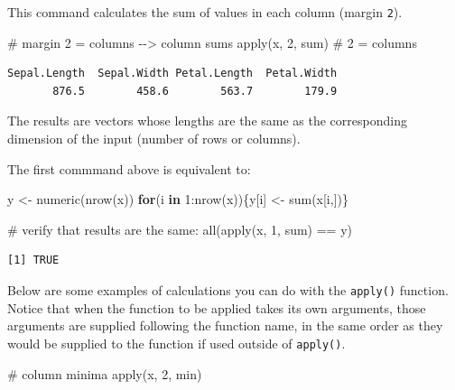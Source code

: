 \documentclass[
  13,
  letterpaper,
]{report}
\newenvironment{Shaded}{\begin{snugshade}}{\end{snugshade}}
\newcommand{\CommentTok}[1]{\textcolor[rgb]{0.37,0.37,0.37}{#1}}
\newcommand{\ControlFlowTok}[1]{\textcolor[rgb]{0.00,0.23,0.31}{\textbf{#1}}}
\newcommand{\DecValTok}[1]{\textcolor[rgb]{0.68,0.00,0.00}{#1}}
\newcommand{\FunctionTok}[1]{\textcolor[rgb]{0.28,0.35,0.67}{#1}}
\newcommand{\NormalTok}[1]{\textcolor[rgb]{0.00,0.23,0.31}{#1}}
\newcommand{\OtherTok}[1]{\textcolor[rgb]{0.00,0.23,0.31}{#1}}
\newcommand{\SpecialCharTok}[1]{\textcolor[rgb]{0.37,0.37,0.37}{#1}}
\begin{document}
This command calculates the sum of values in each column (margin
\texttt{2}).

\begin{Shaded}
\begin{Highlighting}[]
\CommentTok{\# margin 2 = columns {-}{-}\textgreater{} column sums}
\FunctionTok{apply}\NormalTok{(x, }\DecValTok{2}\NormalTok{, sum) }\CommentTok{\# 2 = columns}
\end{Highlighting}
\end{Shaded}

\begin{verbatim}
Sepal.Length  Sepal.Width Petal.Length  Petal.Width 
       876.5        458.6        563.7        179.9 
\end{verbatim}

The results are vectors whose lengths are the same as the corresponding
dimension of the input (number of rows or columns).

The first commmand above is equivalent to:

\begin{Shaded}
\begin{Highlighting}[]
\NormalTok{y }\OtherTok{\textless{}{-}} \FunctionTok{numeric}\NormalTok{(}\FunctionTok{nrow}\NormalTok{(x))}
\ControlFlowTok{for}\NormalTok{(i }\ControlFlowTok{in} \DecValTok{1}\SpecialCharTok{:}\FunctionTok{nrow}\NormalTok{(x))\{y[i] }\OtherTok{\textless{}{-}} \FunctionTok{sum}\NormalTok{(x[i,])\}}

\CommentTok{\# verify that results are the same:}
\FunctionTok{all}\NormalTok{(}\FunctionTok{apply}\NormalTok{(x, }\DecValTok{1}\NormalTok{, sum) }\SpecialCharTok{==}\NormalTok{ y)}
\end{Highlighting}
\end{Shaded}

\begin{verbatim}
[1] TRUE
\end{verbatim}

Below are some examples of calculations you can do with the
\texttt{apply()} function. Notice that when the function to be applied
takes its own arguments, those arguments are supplied following the
function name, in the same order as they would be supplied to the
function if used outside of \texttt{apply()}.

\begin{Shaded}
\begin{Highlighting}[]
\CommentTok{\# column minima}
\FunctionTok{apply}\NormalTok{(x, }\DecValTok{2}\NormalTok{, min)}
\end{Highlighting}
\end{Shaded}
\end{document}
